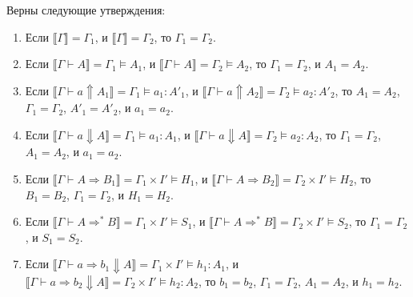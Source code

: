 \documentclass{amsart}
\theoremstyle{definition}
\theoremstyle{remark}
\newcommand{\red}{\Rightarrow}
\renewcommand{\ll}{\llbracket}
\newcommand{\rr}{\rrbracket}
\numberwithin{figure}{section}
\begin{document}
\begin{lem}
Верны следующие утверждения:
\begin{enumerate}
\item Если $\ll \Gamma \rr = \Gamma_1$, и $\ll \Gamma \rr = \Gamma_2$, то $\Gamma_1 = \Gamma_2$.
\item Если $\ll \Gamma \vdash A \rr = \Gamma_1 \models A_1$, и $\ll \Gamma \vdash A \rr = \Gamma_2 \models A_2$, то $\Gamma_1 = \Gamma_2$, и $A_1 = A_2$.
\item Если $\ll \Gamma \vdash a \Uparrow A_1 \rr = \Gamma_1 \models a_1 : A'_1$, и $\ll \Gamma \vdash a \Uparrow A_2 \rr = \Gamma_2 \models a_2 : A'_2$, то $A_1 = A_2$, $\Gamma_1 = \Gamma_2$, $A'_1 = A'_2$, и $a_1 = a_2$.
\item Если $\ll \Gamma \vdash a \Downarrow A \rr = \Gamma_1 \models a_1 : A_1$, и $\ll \Gamma \vdash a \Downarrow A \rr = \Gamma_2 \models a_2 : A_2$, то $\Gamma_1 = \Gamma_2$, $A_1 = A_2$, и $a_1 = a_2$.
\item Если $\ll \Gamma \vdash A \red B_1 \rr = \Gamma_1 \times I' \models H_1$, и $\ll \Gamma \vdash A \red B_2 \rr = \Gamma_2 \times I' \models H_2$, то $B_1 = B_2$, $\Gamma_1 = \Gamma_2$, и $H_1 = H_2$.
\item Если $\ll \Gamma \vdash A \red^* B \rr = \Gamma_1 \times I' \models S_1$, и $\ll \Gamma \vdash A \red^* B \rr = \Gamma_2 \times I' \models S_2$, то $\Gamma_1 = \Gamma_2$, и $S_1 = S_2$.
\item Если $\ll \Gamma \vdash a \red b_1 \Downarrow A \rr = \Gamma_1 \times I' \models h_1 : A_1$, и $\ll \Gamma \vdash a \red b_2 \Downarrow A \rr = \Gamma_2 \times I' \models h_2 : A_2$, то $b_1 = b_2$, $\Gamma_1 = \Gamma_2$, $A_1 = A_2$, и $h_1 = h_2$.
\end{enumerate}
\end{lem}
\end{document}
